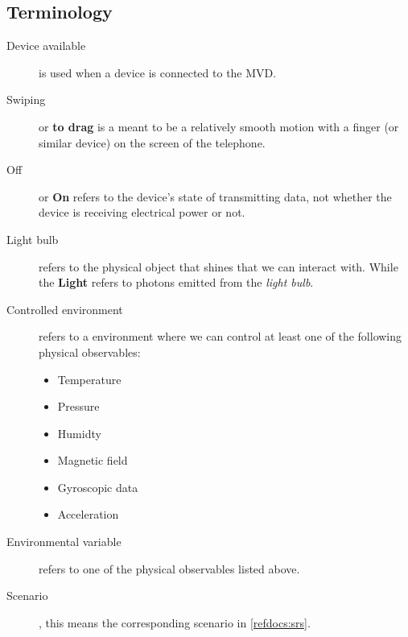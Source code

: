 \documentclass[a4paper]{article}
\begin{document}
\subsection{Terminology}
\begin{description}
\item[Device available] is used when a device is connected to the MVD.
\item[Swiping] or \textbf{to drag} is a meant to be a relatively smooth motion with a finger (or similar device) on the screen of the telephone.
\item[Off] or \textbf{On} refers to the device's state of transmitting data, not whether the device is receiving electrical power or not.
\item[Light bulb] refers to the physical object that shines that we can interact with. While the \textbf{Light} refers to photons emitted from the  \textit{light bulb}.
\item[Controlled environment] refers to a environment where we can control at least one of the following physical observables:
	\begin{itemize}
	\item Temperature
	\item Pressure
	\item Humidty
	\item Magnetic field
	\item Gyroscopic data
	\item Acceleration
	\end{itemize}
\item[Environmental variable] refers to one of the physical observables listed above.
\item[Scenario], this means the corresponding scenario in \ref{refdocs:srs}.
\end{description}
\newpage
\end{document}
